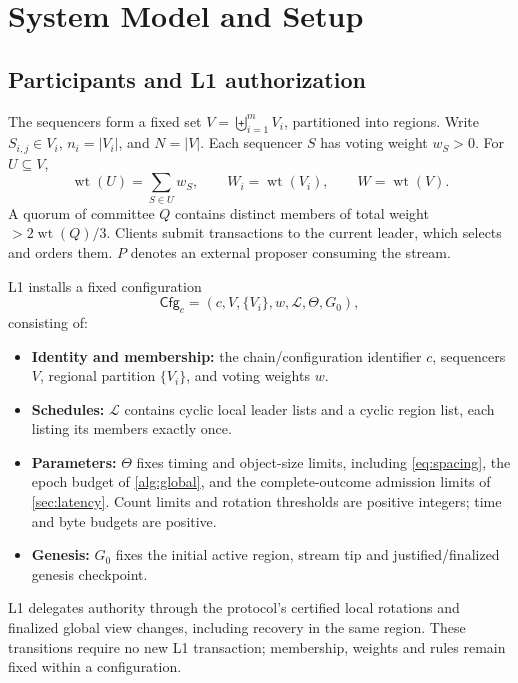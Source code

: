 \documentclass[11pt,a4paper,onecolumn]{article}
\newcommand{\Cfg}{\mathsf{Cfg}}
\newcommand{\wt}{\operatorname{wt}}
\theoremstyle{remark}\newtheorem{example}[definition]{Example}
\newcounter{protocol}
\begin{document}
\section{System Model and Setup}\label{sec:model}
\subsection{Participants and L1 authorization}
The sequencers form a fixed set $V=\biguplus_{i=1}^{m}V_i$, partitioned into
regions. Write $S_{i,j}\in V_i$, $n_i=|V_i|$, and $N=|V|$. Each sequencer $S$
has voting weight $w_S>0$. For $U\subseteq V$,
\[
 \wt(U)=\sum_{S\in U}w_S,\qquad W_i=\wt(V_i),\qquad W=\wt(V).
\]
A quorum of committee $Q$ contains distinct members of total weight
$>2\wt(Q)/3$. Clients submit transactions to the current leader, which selects
and orders them. $P$ denotes an external proposer consuming the stream.

L1 installs a fixed configuration
\begin{equation}\label{eq:cfg}
 \Cfg_c=(c,V,\{V_i\},w,\mathcal L,\Theta,G_0),
\end{equation}
consisting of:
\begin{itemize}
\item \textbf{Identity and membership:} the chain/configuration identifier $c$,
sequencers $V$, regional partition $\{V_i\}$, and voting weights $w$.
\item \textbf{Schedules:} $\mathcal L$ contains cyclic local leader lists and a
cyclic region list, each listing its members exactly once.
\item \textbf{Parameters:} $\Theta$ fixes timing and object-size limits,
including \eqref{eq:spacing}, the epoch budget of \cref{alg:global}, and the
complete-outcome admission limits of \cref{sec:latency}. Count limits and
rotation thresholds are positive integers; time and byte budgets are positive.
\item \textbf{Genesis:} $G_0$ fixes the initial active region, stream tip and
justified/finalized genesis checkpoint.
\end{itemize}
L1 delegates authority through the protocol's certified local rotations and
finalized global view changes, including recovery in the same region. These
transitions require no new L1 transaction; membership, weights and rules remain
fixed within a configuration.
\end{document}
